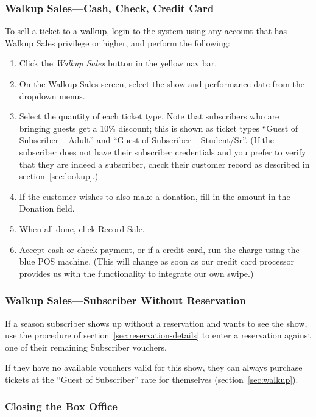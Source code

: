 \subsubsection{Walkup Sales---Cash, Check, Credit Card}
\label{sec:walkupsales}

To sell a ticket to a walkup, login to the system using any account that
has Walkup Sales privilege or higher, and perform the following:

\begin{enumerate}
\item Click the \emph{Walkup Sales} button in the yellow nav bar.
\item On the Walkup Sales screen, select the show and performance date
  from the dropdown menus.
\item Select the quantity of each ticket type. Note that subscribers who
  are bringing guests get a 10\% discount; this is shown as ticket types
  ``Guest of Subscriber -- Adult'' and ``Guest of Subscriber --
  Student/Sr''.  (If the subscriber does not have their subscriber
  credentials  and you prefer to verify that they are
  indeed a subscriber, check their customer record as described in
  section~\ref{sec:lookup}.)
\item If the customer wishes to also make a donation, fill in the amount
  in the Donation field.
\item When all done, click Record Sale.
\item Accept cash or check payment, or if a credit card, run the charge
  using the blue POS machine.  (This will change as soon as our credit
  card processor provides us with the functionality to integrate our own
  swipe.) 
\end{enumerate}

\subsubsection{Walkup Sales---Subscriber Without Reservation}
\label{sec:walkupsubscriber}

If a season subscriber shows up without a reservation and wants to see
the show, use the procedure of section~\ref{sec:reservation-details} to 
enter a reservation against one of their remaining Subscriber vouchers.

If they have no available vouchers valid for this show, they can always
purchase tickets at the ``Guest of Subscriber'' rate for themselves
(section~\ref{sec:walkup}). 


\subsubsection{Closing the Box Office}

